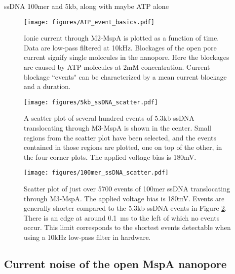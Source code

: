 ssDNA 100mer and 5kb, along with maybe ATP alone

\begin{figure}[h]
\begin{centering}
\texttt{[image: figures/ATP\_event\_basics.pdf]}
\caption[Current blockage events in the MspA nanopore]{Ionic current through M2-MspA is plotted as a function of time.  Data are low-pass filtered at 10kHz.  Blockages of the open pore current signify single molecules in the nanopore.  Here the blockages are caused by ATP molecules at 2mM concentration.  Current blockage ``events" can be characterized by a mean current blockage and a duration.}
\label{fig:mspa_event_basics}
\end{centering}
\end{figure}

\begin{figure}[h]
\begin{centering}
\texttt{[image: figures/5kb\_ssDNA\_scatter.pdf]}
\caption[Scatter plot of 5.3kb ssDNA in MspA]{A scatter plot of several hundred events of 5.3kb ssDNA translocating through M3-MspA is shown in the center.  Small regions from the scatter plot have been selected, and the events contained in those regions are plotted, one on top of the other, in the four corner plots.  The applied voltage bias is 180mV.}
\label{fig:mspa_5kb_scatter}
\end{centering}
\end{figure}

\begin{figure}[h]
\begin{centering}
\texttt{[image: figures/100mer\_ssDNA\_scatter.pdf]}
\caption[Scatter plot of 100mer ssDNA in MspA]{Scatter plot of just over 5700 events of 100mer ssDNA translocating through M3-MspA.  The applied voltage bias is 180mV.  Events are generally shorter compared to the 5.3kb ssDNA events in Figure \ref{fig:mspa_5kb_scatter}.  There is an edge at around \SI{0.1}{ms} to the left of which no events occur.  This limit corresponds to the shortest events detectable when using a 10kHz low-pass filter in hardware.}
\label{fig:mspa_100mer_scatter}
\end{centering}
\end{figure}

\subsection{Current noise of the open MspA nanopore}

